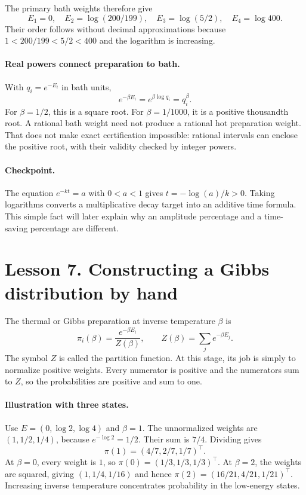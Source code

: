 \documentclass[11pt]{article}
\begin{document}
The primary bath weights therefore give
\[
E_1=0,\quad E_2=\log(200/199),\quad
E_3=\log(5/2),\quad E_4=\log400.
\]
Their order follows without decimal approximations because
$1<200/199<5/2<400$ and the logarithm is increasing.

\paragraph{Real powers connect preparation to bath.}
With $q_i=e^{-E_i}$ in bath units,
\[
e^{-\beta E_i}=e^{\beta\log q_i}=q_i^\beta.
\]
For $\beta=1/2$, this is a square root. For $\beta=1/1000$, it is a positive
thousandth root. A rational bath weight need not produce a rational hot
preparation weight. That does not make exact certification impossible:
rational intervals can enclose the positive root, with their validity checked
by integer powers.

\paragraph{Checkpoint.}
The equation $e^{-kt}=a$ with $0<a<1$ gives
$t=-\log(a)/k>0$. Taking logarithms converts a multiplicative decay target into
an additive time formula. This simple fact will later explain why an amplitude
percentage and a time-saving percentage are different.

\clearpage
\section*{Lesson 7. Constructing a Gibbs distribution by hand}
The thermal or Gibbs preparation at inverse temperature $\beta$ is
\[
\pi_i(\beta)=\frac{e^{-\beta E_i}}{Z(\beta)},
\qquad Z(\beta)=\sum_j e^{-\beta E_j}.
\]
The symbol $Z$ is called the partition function. At this stage, its job is
simply to normalize positive weights. Every numerator is positive and the
numerators sum to $Z$, so the probabilities are positive and sum to one.

\paragraph{Illustration with three states.}
Use $E=(0,\log2,\log4)$ and $\beta=1$. The unnormalized weights are
$(1,1/2,1/4)$, because $e^{-\log2}=1/2$. Their sum is $7/4$. Dividing gives
\[
\pi(1)=(4/7,2/7,1/7)^\top.
\]
At $\beta=0$, every weight is $1$, so $\pi(0)=(1/3,1/3,1/3)^\top$.
At $\beta=2$, the weights are squared, giving $(1,1/4,1/16)$ and hence
$\pi(2)=(16/21,4/21,1/21)^\top$. Increasing inverse temperature concentrates
probability in the low-energy states.
\end{document}
